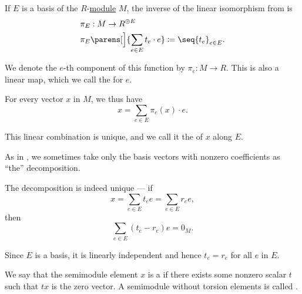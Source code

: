 \begin{definition}\label{def:basis_decomposition}\mimprovised
  If \( E \) is a basis of the \( R \)-\hyperref[def:module]{module} \( M \), the inverse of the linear isomorphism from  is
  \begin{equation*}
    \begin{aligned}
      &\pi_E: M \to R^{\oplus E} \\
      &\pi_E\parens[\Big]{ \sum_{e \in E} t_e \cdot e } \coloneqq \seq{ t_e }_{e \in E}.
    \end{aligned}
  \end{equation*}

  We denote the \( e \)-th component of this function by \( \pi_e: M \to R \). This is also a linear map, which we call the  for \( e \).

  For every vector \( x \) in \( M \), we thus have
  \begin{equation*}
    x = \sum_{e \in E} \pi_e(x) \cdot e.
  \end{equation*}

  This linear combination is unique, and we call it the  of \( x \) along \( E \).

  As in , we sometimes take only the basis vectors with nonzero coefficients as \enquote{the} decomposition.
\end{definition}
\begin{defproof}
  The decomposition is indeed unique --- if
  \begin{equation*}
    x = \sum_{e \in E} t_e e = \sum_{e \in E} r_e e,
  \end{equation*}
  then
  \begin{equation*}
    \sum_{e \in E} (t_e - r_e) e = 0_M.
  \end{equation*}

  Since \( E \) is a basis, it is linearly independent and hence \( t_e = r_e \) for all \( e \) in \( E \).
\end{defproof}

\begin{definition}\label{def:semimodule_torsion}\mimprovised
  We say that the semimodule element \( x \) is a  if there exists some nonzero scalar \( t \) such that \( tx \) is the zero vector. A semimodule without torsion elements is called .
\end{definition}

